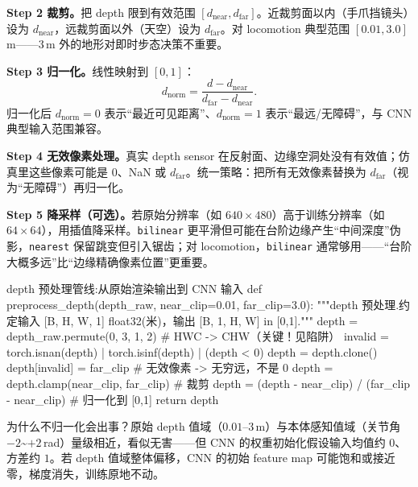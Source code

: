\textbf{Step 2 裁剪。}把 depth 限到有效范围 $[d_{\text{near}}, d_{\text{far}}]$。近裁剪面以内（手爪挡镜头）设为 $d_{\text{near}}$，远裁剪面以外（天空）设为 $d_{\text{far}}$。对 locomotion 典型范围 $[0.01, 3.0]$\,m——$3$\,m 外的地形对即时步态决策不重要。

\textbf{Step 3 归一化。}线性映射到 $[0,1]$：
\begin{equation}
d_{\text{norm}} = \frac{d - d_{\text{near}}}{d_{\text{far}} - d_{\text{near}}}.
\label{eq:rlmc-vm-norm}
\end{equation}
归一化后 $d_{\text{norm}}=0$ 表示“最近可见距离”、$d_{\text{norm}}=1$ 表示“最远/无障碍”，与 CNN 典型输入范围兼容。

\textbf{Step 4 无效像素处理。}真实 depth sensor 在反射面、边缘空洞处没有有效值；仿真里这些像素可能是 $0$、NaN 或 $d_{\text{far}}$。统一策略：把所有无效像素替换为 $d_{\text{far}}$（视为“无障碍”）再归一化。

\textbf{Step 5 降采样（可选）。}若原始分辨率（如 $640\times480$）高于训练分辨率（如 $64\times64$），用插值降采样。\verb|bilinear| 更平滑但可能在台阶边缘产生“中间深度”伪影，\verb|nearest| 保留跳变但引入锯齿；对 locomotion，\verb|bilinear| 通常够用——“台阶大概多远”比“边缘精确像素位置”更重要。

\begin{codebox}[Python]{depth 预处理管线:从原始渲染输出到 CNN 输入}
def preprocess_depth(depth_raw, near_clip=0.01, far_clip=3.0):
    """depth 预处理.约定输入 [B, H, W, 1] float32(米)，输出 [B, 1, H, W] in [0,1]."""
    depth = depth_raw.permute(0, 3, 1, 2)          # HWC -> CHW（关键！见陷阱）
    invalid = torch.isnan(depth) | torch.isinf(depth) | (depth < 0)
    depth = depth.clone()
    depth[invalid] = far_clip                       # 无效像素 -> 无穷远，不是 0
    depth = depth.clamp(near_clip, far_clip)        # 裁剪
    depth = (depth - near_clip) / (far_clip - near_clip)  # 归一化到 [0,1]
    return depth
\end{codebox}

为什么不归一化会出事？原始 depth 值域（$0.01$--$3$\,m）与本体感知值域（关节角 $-2$\textasciitilde$+2$\,rad）量级相近，看似无害——但 CNN 的权重初始化假设输入均值约 $0$、方差约 $1$。若 depth 值域整体偏移，CNN 的初始 feature map 可能饱和或接近零，梯度消失，训练原地不动。


